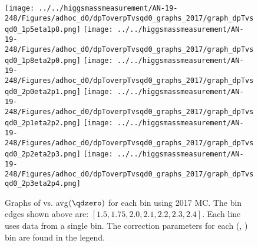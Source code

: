 \begin{figure}[!htbp]
    \centering
    { \texttt{[image: ../../higgsmassmeasurement/AN-19-248/Figures/adhoc\_d0/dpToverpTvsqd0\_graphs\_2017/graph\_dpTvsqd0\_1p5eta1p8.png]}}
    { \texttt{[image: ../../higgsmassmeasurement/AN-19-248/Figures/adhoc\_d0/dpToverpTvsqd0\_graphs\_2017/graph\_dpTvsqd0\_1p8eta2p0.png]}}
    { \texttt{[image: ../../higgsmassmeasurement/AN-19-248/Figures/adhoc\_d0/dpToverpTvsqd0\_graphs\_2017/graph\_dpTvsqd0\_2p0eta2p1.png]}}
    { \texttt{[image: ../../higgsmassmeasurement/AN-19-248/Figures/adhoc\_d0/dpToverpTvsqd0\_graphs\_2017/graph\_dpTvsqd0\_2p1eta2p2.png]}}
    { \texttt{[image: ../../higgsmassmeasurement/AN-19-248/Figures/adhoc\_d0/dpToverpTvsqd0\_graphs\_2017/graph\_dpTvsqd0\_2p2eta2p3.png]}}
    { \texttt{[image: ../../higgsmassmeasurement/AN-19-248/Figures/adhoc\_d0/dpToverpTvsqd0\_graphs\_2017/graph\_dpTvsqd0\_2p3eta2p4.png]}}
    \caption{ 
        Graphs of \pTmismeas vs. avg$(\qdzero)$ for each \abseta bin using 2017 MC.
        The \abseta bin edges shown above are: $[1.5, 1.75, 2.0, 2.1, 2.2, 2.3, 2.4]$.
        Each line uses data from a single \pT bin. 
        The \pT correction parameters for each (\abseta, \pT) bin are found in the legend.
    }
\end{figure}

